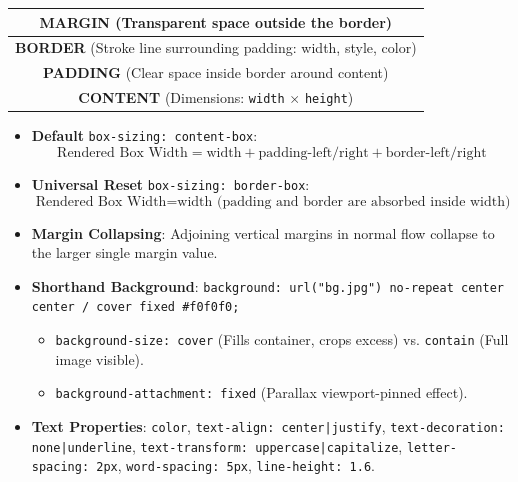 \documentclass[a4paper,11pt]{article}
\begin{document}
\begin{conceptbox}
\begin{center}
\begin{tabular}{|c|}
\hline
\textbf{MARGIN} (Transparent space outside the border) \\
\hline
\textbf{BORDER} (Stroke line surrounding padding: width, style, color) \\
\hline
\textbf{PADDING} (Clear space inside border around content) \\
\hline
\textbf{CONTENT} (Dimensions: \texttt{width} $\times$ \texttt{height}) \\
\hline
\end{tabular}
\end{center}
\begin{itemize}[leftmargin=*]
    \item \textbf{Default} \texttt{box-sizing: content-box}:
    $$\text{Rendered Box Width} = \text{width} + \text{padding-left/right} + \text{border-left/right}$$
    \item \textbf{Universal Reset} \texttt{box-sizing: border-box}:
    $$\text{Rendered Box Width} = \text{width (padding and border are absorbed inside width)}$$
    \item \textbf{Margin Collapsing}: Adjoining vertical margins in normal flow collapse to the larger single margin value.
\end{itemize}
\end{conceptbox}

\begin{examalert}
\begin{itemize}[leftmargin=*]
    \item \textbf{Shorthand Background}: \texttt{background: url("bg.jpg") no-repeat center center / cover fixed \#f0f0f0;}
    \begin{itemize}
        \item \texttt{background-size: cover} (Fills container, crops excess) vs. \texttt{contain} (Full image visible).
        \item \texttt{background-attachment: fixed} (Parallax viewport-pinned effect).
    \end{itemize}
    \item \textbf{Text Properties}: \texttt{color}, \texttt{text-align: center|justify}, \texttt{text-decoration: none|underline}, \texttt{text-transform: uppercase|capitalize}, \texttt{letter-spacing: 2px}, \texttt{word-spacing: 5px}, \texttt{line-height: 1.6}.
\end{itemize}
\end{examalert}
\end{document}
